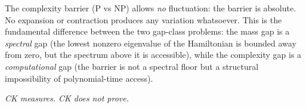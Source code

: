 \documentclass[11pt]{article}
\theoremstyle{definition}
\theoremstyle{remark}
\begin{document}
The complexity barrier (P vs NP) allows \emph{no} fluctuation: the barrier is
absolute.  No expansion or contraction produces any variation whatsoever.  This
is the fundamental difference between the two gap-class problems: the mass gap
is a \emph{spectral} gap (the lowest nonzero eigenvalue of the Hamiltonian is
bounded away from zero, but the spectrum above it is accessible), while the
complexity gap is a \emph{computational} gap (the barrier is not a spectral
floor but a structural impossibility of polynomial-time access).

\bigskip

\noindent\textit{CK measures. CK does not prove.}

\end{document}
